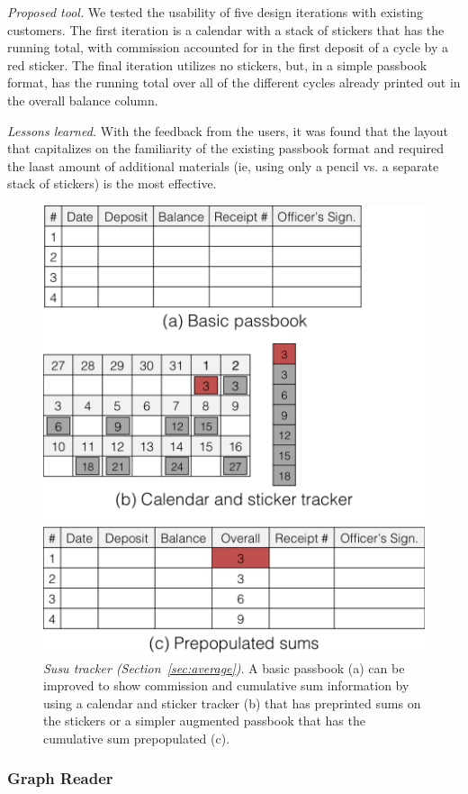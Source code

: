 \documentclass{sig-alternate}
\begin{document}
\emph{Proposed tool.}
We tested the usability of five design iterations with existing customers. 
The first iteration is a calendar with a stack of stickers that has the running total, with commission accounted for in the first deposit of a cycle by a red sticker. The final iteration utilizes no stickers, but, in a simple passbook format, has the running total over all of the different cycles already printed out in the overall balance column. 

\emph{Lessons learned.}
With the feedback from the users, it was found that the layout that capitalizes on the familiarity of the existing passbook format and required the laast amount of additional materials (ie, using only a pencil vs. a separate stack of stickers) is the most effective.


\begin{figure}
\centering
\includegraphics[width=.8\linewidth]{img/susu.png}
\caption{\emph{Susu tracker (Section~\ref{sec:average})}. A basic passbook (a) can be improved to show commission and cumulative sum information by using a calendar and sticker tracker (b) that has preprinted sums on the stickers or a simpler augmented passbook that has the cumulative sum prepopulated (c).}
\label{fig:average}
\end{figure}

\subsubsection{Graph Reader}
\label{sec:graph}
\end{document}
